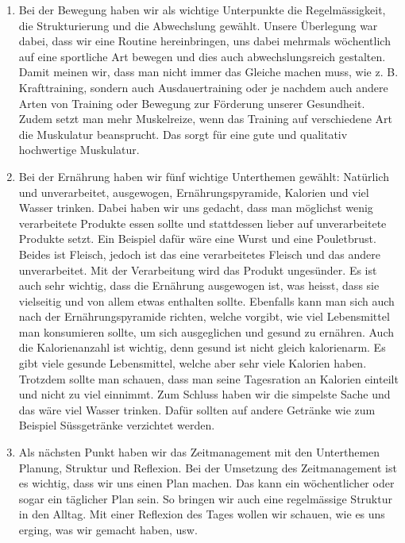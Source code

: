 \begin{enumerate}
  \item Bei der Bewegung haben wir als wichtige Unterpunkte die Regelmässigkeit, die Strukturierung und die Abwechslung gewählt. Unsere Überlegung war dabei, dass wir eine Routine hereinbringen, uns dabei mehrmals wöchentlich auf eine sportliche Art bewegen und dies auch abwechslungsreich gestalten. Damit meinen wir, dass man nicht immer das Gleiche machen muss, wie z. B. Krafttraining, sondern auch Ausdauertraining oder je nachdem auch andere Arten von Training oder Bewegung zur Förderung unserer Gesundheit. Zudem setzt man mehr Muskelreize, wenn das Training auf verschiedene Art die Muskulatur beansprucht. Das sorgt für eine gute und qualitativ hochwertige Muskulatur.
  \item Bei der Ernährung haben wir fünf wichtige Unterthemen gewählt: Natürlich und unverarbeitet, ausgewogen, Ernährungspyramide, Kalorien und viel Wasser trinken. Dabei haben wir uns gedacht, dass man möglichst wenig verarbeitete Produkte essen sollte und stattdessen lieber auf unverarbeitete Produkte setzt. Ein Beispiel dafür wäre eine Wurst und eine Pouletbrust. Beides ist Fleisch, jedoch ist das eine verarbeitetes Fleisch und das andere unverarbeitet. Mit der Verarbeitung wird das Produkt ungesünder. Es ist auch sehr wichtig, dass die Ernährung ausgewogen ist, was heisst, dass sie vielseitig und von allem etwas enthalten sollte. Ebenfalls kann man sich auch nach der Ernährungspyramide richten, welche vorgibt, wie viel Lebensmittel man konsumieren sollte, um sich ausgeglichen und gesund zu ernähren. Auch die Kalorienanzahl ist wichtig, denn gesund ist nicht gleich kalorienarm. Es gibt viele gesunde Lebensmittel, welche aber sehr viele Kalorien haben. Trotzdem sollte man schauen, dass man seine Tagesration an Kalorien einteilt und nicht zu viel einnimmt. Zum Schluss haben wir die simpelste Sache und das wäre viel Wasser trinken. Dafür sollten auf andere Getränke wie zum Beispiel Süssgetränke verzichtet werden.
  \item Als nächsten Punkt haben wir das Zeitmanagement mit den Unterthemen Planung, Struktur und Reflexion. Bei der Umsetzung des Zeitmanagement ist es wichtig, dass wir uns einen Plan machen. Das kann ein wöchentlicher oder sogar ein täglicher Plan sein. So bringen wir auch eine regelmässige Struktur in den Alltag. Mit einer Reflexion des Tages wollen wir schauen, wie es uns erging, was wir gemacht haben, usw.
  \pagebreak

\end{enumerate}

